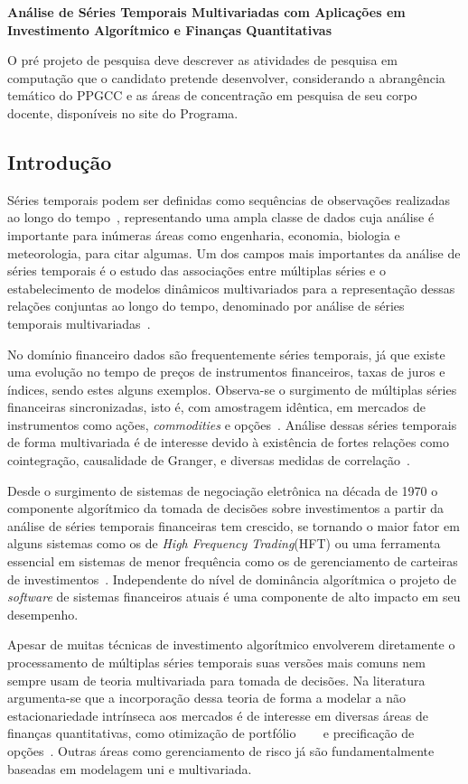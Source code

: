 \documentclass[a4paper, 12pt]{article}
\begin{document}
\textbf{\large Análise de Séries Temporais Multivariadas com Aplicações em
Investimento Algorítmico e Finanças Quantitativas}

O pré projeto de pesquisa deve descrever as atividades de pesquisa em computação
que o candidato pretende desenvolver, considerando a abrangência temático do
PPGCC e as áreas de concentração em pesquisa de seu corpo docente, disponíveis
no site do Programa.

\subsection*{Introdução}

Séries temporais podem ser definidas como sequências de observações realizadas
ao longo do tempo~\cite{chatfield}, representando uma ampla classe de dados
cuja análise é importante para inúmeras áreas como engenharia, economia,
biologia e meteorologia, para citar algumas. Um dos campos mais importantes da
análise de séries temporais é o estudo das associações entre múltiplas séries e o
estabelecimento de modelos dinâmicos multivariados para a representação dessas
relações conjuntas ao longo do tempo, denominado por análise de séries
temporais multivariadas~\cite{box}.

No domínio financeiro dados são frequentemente séries temporais, já que
existe uma evolução no tempo de preços de instrumentos financeiros, taxas de
juros e índices, sendo estes alguns exemplos. Observa-se o surgimento de
múltiplas séries financeiras sincronizadas, isto é, com amostragem idêntica, em
mercados de instrumentos como ações, \emph{commodities} e opções~\cite{tsay}.
Análise dessas séries temporais de forma multivariada é de interesse devido à
existência de fortes relações como cointegração, causalidade de Granger, e
diversas medidas de correlação~\cite{morettin}.

Desde o surgimento de sistemas de negociação eletrônica na década de 1970 o
componente algorítmico da tomada de decisões sobre investimentos a partir da
análise de séries temporais financeiras tem crescido, se tornando o maior fator
em alguns sistemas como os de \emph{High Frequency Trading}(HFT) ou uma
ferramenta essencial em sistemas de menor frequência como os de gerenciamento
de carteiras de investimentos~\cite{kissell}. Independente do nível de
dominância algorítmica o projeto de \emph{software} de sistemas financeiros
atuais é uma componente de alto impacto em seu desempenho.

Apesar de muitas técnicas de investimento algorítmico envolverem diretamente o
processamento de múltiplas séries temporais suas versões mais comuns nem sempre
usam de teoria multivariada para tomada de decisões. Na literatura argumenta-se
que a incorporação dessa teoria de forma a modelar a não
estacionariedade intrínseca aos mercados é de interesse em diversas áreas de
finanças quantitativas, como otimização de portfólio~\cite{procacci}
~\cite{luo}~\cite{guastaroba} e precificação de opções~\cite{chorro}.
Outras áreas como gerenciamento de risco já são fundamentalmente baseadas em
modelagem uni e multivariada.
\end{document}
